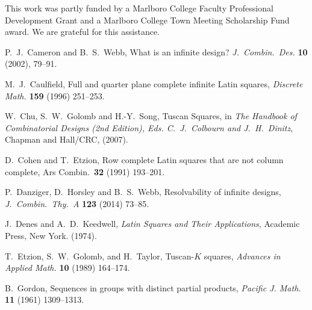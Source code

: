 \documentclass[12pt,a4paper]{article}
\begin{document}
This work was partly funded by a  Marlboro College Faculty Professional Development Grant and a Marlboro College Town Meeting Scholarship Fund award.  We are grateful for this assistance.


\begin{thebibliography}{99}





P.~J.~Cameron and B.~S.~Webb, What is an infinite design? {\em J.~Combin.~Des.} {\bf 10} (2002), 79--91.

M.~J.~Caulfield, Full and quarter plane complete infinite Latin squares, {\em Discrete Math.} {\bf 159} (1996) 251--253.

W.~Chu, S.~W.~Golomb and H.-Y.~Song, Tuscan Squares, in {\em The Handbook of Combinatorial Designs (2nd Edition), Eds. C.~J.~Colbourn and J.~H.~Dinitz}, Chapman and Hall/CRC, (2007).

D.~Cohen and T.~Etzion, Row complete Latin squares that are not column complete, Ars Combin.~{\bf 32} (1991) 193--201.

P.~Danziger, D.~Horsley and B.~S.~Webb, Resolvability of infinite designs, {\em J.~Combin.~Thy.~A} {\bf 123} (2014) 73--85.

J.~Denes and A.~D.~Keedwell, {\em Latin Squares and Their Applications}, Academic Press, New York. (1974).

T.~Etzion, S.~W.~Golomb, and H.~Taylor, Tuscan-$K$ squares, {\em Advances in Applied Math.} {\bf 10} (1989) 164--174.




 B.~Gordon, Sequences in groups with distinct partial products, {\em Pacific J. Math.} {\bf 11} (1961) 1309--1313.


\end{thebibliography}
\end{document}
